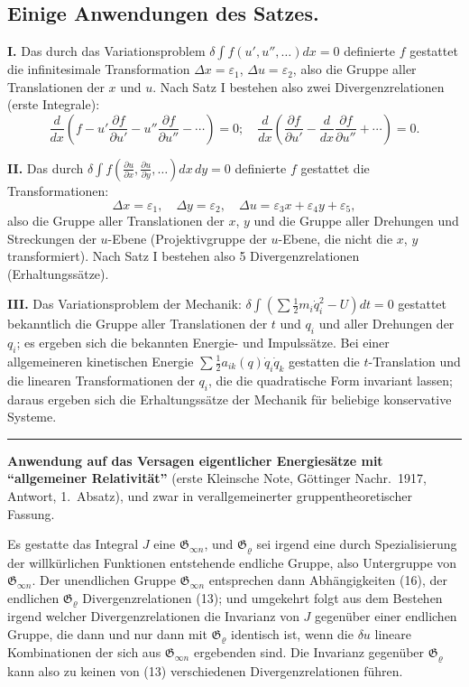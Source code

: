 \documentclass[12pt,a4paper]{article}
\begin{document}
\subsection*{Einige Anwendungen des Satzes.}

\textbf{I.} Das durch das Variationsproblem $\delta\int f(u',u'',\ldots)dx=0$ definierte $f$ gestattet die infinitesimale Transformation $\Delta x=\varepsilon_{1}$, $\Delta u=\varepsilon_{2}$, also die Gruppe aller Translationen der $x$ und $u$. Nach Satz I bestehen also zwei Divergenzrelationen (erste Integrale):
\[
\frac{d}{dx}\left(f-u'\frac{\partial f}{\partial u'}-u''\frac{\partial f}{\partial u''}-\cdots\right)=0;\quad
\frac{d}{dx}\left(\frac{\partial f}{\partial u'}-\frac{d}{dx}\frac{\partial f}{\partial u''}+\cdots\right)=0.
\]

\textbf{II.} Das durch $\delta\int f\left(\tfrac{\partial u}{\partial x},\tfrac{\partial u}{\partial y},\ldots\right)dx\,dy=0$ definierte $f$ gestattet die Transformationen:
\[
\Delta x=\varepsilon_{1},\quad\Delta y=\varepsilon_{2},\quad\Delta u=\varepsilon_{3}x+\varepsilon_{4}y+\varepsilon_{5},
\]
also die Gruppe aller Translationen der $x$, $y$ und die Gruppe aller Drehungen und Streckungen der $u$-Ebene (Projektivgruppe der $u$-Ebene, die nicht die $x$, $y$ transformiert). Nach Satz I bestehen also 5 Divergenzrelationen (Erhaltungss\"atze).

\textbf{III.} Das Variationsproblem der Mechanik: $\delta\int\left(\sum\tfrac{1}{2}m_{i}\dot{q}_{i}^{2}-U\right)dt=0$ gestattet bekanntlich die Gruppe aller Translationen der $t$ und $q_{i}$ und aller Drehungen der $q_{i}$; es ergeben sich die bekannten Energie- und Impulss\"atze. Bei einer allgemeineren kinetischen Energie $\sum\tfrac{1}{2}a_{ik}(q)\dot{q}_{i}\dot{q}_{k}$ gestatten die $t$-Translation und die linearen Transformationen der $q_{i}$, die die quadratische Form invariant lassen; daraus ergeben sich die Erhaltungss\"atze der Mechanik f\"ur beliebige konservative Systeme.

\medskip
\noindent\rule{0.3\textwidth}{0.4pt}

\textbf{Anwendung auf das Versagen eigentlicher Energies\"atze mit ``allgemeiner Relativit\"at''} (erste Kleinsche Note, G\"ottinger Nachr.\ 1917, Antwort, 1.\ Absatz), und zwar in verallgemeinerter gruppentheoretischer Fassung.

Es gestatte das Integral $J$ eine $\mathfrak{G}_{\infty n}$, und $\mathfrak{G}_{\varrho}$ sei irgend eine durch Spezialisierung der willk\"urlichen Funktionen entstehende endliche Gruppe, also Untergruppe von $\mathfrak{G}_{\infty n}$. Der unendlichen Gruppe $\mathfrak{G}_{\infty n}$ entsprechen dann Abh\"angigkeiten (16), der endlichen $\mathfrak{G}_{\varrho}$ Divergenzrelationen (13); und umgekehrt folgt aus dem Bestehen irgend welcher Divergenzrelationen die Invarianz von $J$ gegen\"uber einer endlichen Gruppe, die dann und nur dann mit $\mathfrak{G}_{\varrho}$ identisch ist, wenn die $\delta u$ lineare Kombinationen der sich aus $\mathfrak{G}_{\infty n}$ ergebenden sind. Die Invarianz gegen\"uber $\mathfrak{G}_{\varrho}$ kann also zu keinen von (13) verschiedenen Divergenzrelationen f\"uhren.
\end{document}
